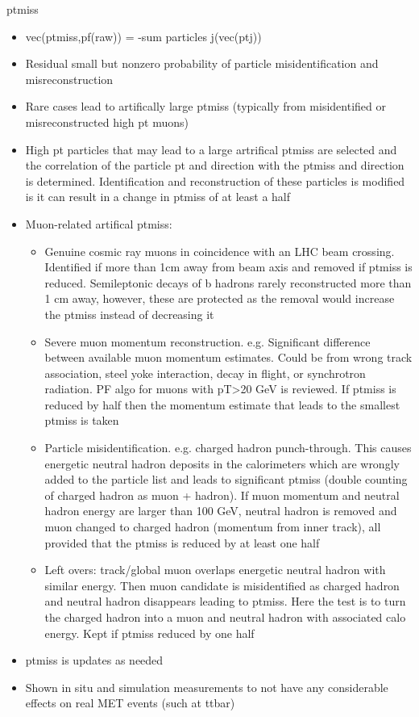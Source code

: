 ptmiss
\begin{itemize}
    \item vec(ptmiss,pf(raw)) = -sum particles j(vec(ptj))
    \item Residual small but nonzero probability of particle misidentification and misreconstruction
    \item Rare cases lead to artifically large ptmiss (typically from misidentified or misreconstructed high pt muons)
    \item High pt particles that may lead to a large artrifical ptmiss are selected and the correlation of the particle pt and direction with the ptmiss and direction is determined. Identification and reconstruction of these particles is modified is it can result in a change in ptmiss of at least a half
    \item Muon-related artifical ptmiss:
    \begin{itemize}
        \item Genuine cosmic ray muons in coincidence with an LHC beam crossing. Identified if more than 1cm away from beam axis and removed if ptmiss is reduced. Semileptonic decays of b hadrons rarely reconstructed more than 1 cm away, however, these are protected as the removal would increase the ptmiss instead of decreasing it
        \item Severe muon momentum reconstruction. e.g. Significant difference between available muon momentum estimates. Could be from wrong track association, steel yoke interaction, decay in flight, or synchrotron radiation. PF algo for muons with pT>20 GeV is reviewed. If ptmiss is reduced by half then the momentum estimate that leads to the smallest ptmiss is taken
        \item Particle misidentification. e.g. charged hadron punch-through. This causes energetic neutral hadron deposits in the calorimeters which are wrongly added to the particle list and leads to significant ptmiss (double counting of charged hadron as muon + hadron). If muon momentum and neutral hadron energy are larger than 100 GeV, neutral hadron is removed and muon changed to charged hadron (momentum from inner track), all provided that the ptmiss is reduced by at least one half
        \item Left overs: track/global muon overlaps energetic neutral hadron with similar energy. Then muon candidate is misidentified as charged hadron and neutral hadron disappears leading to ptmiss. Here the test is to turn the charged hadron into a muon and neutral hadron with associated calo energy. Kept if ptmiss reduced by one half
    \end{itemize}
    \item ptmiss is updates as needed
    \item Shown in situ and simulation measurements to not have any considerable effects on real MET events (such at ttbar)
\end{itemize}

